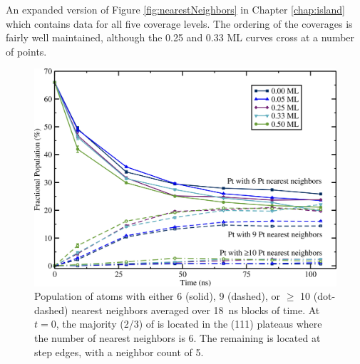 An expanded version of Figure \ref{fig:nearestNeighbors} in Chapter \ref{chap:island} which contains data
for all five  coverage levels.  The ordering of the coverages
is fairly well maintained, although the 0.25 and 0.33 ML curves cross
at a number of points.

\begin{figure}
\includegraphics[width=\linewidth]{../figures/appA/nearestNeighbor_full_withmorenn_photoshopped.pdf}
\caption{Population of  atoms with either 6 (solid), 9
  (dashed), or $\ge$ 10 (dot-dashed)  nearest neighbors
  averaged over 18~ns blocks of time.  At $t = 0$, the majority
  (2/3) of  is located in the (111) plateaus where
  the number of  nearest neighbors is 6. The remaining 
  is located at step edges, with a neighbor  count of 5.}
\label{fig:nn_full} 
\end{figure}





